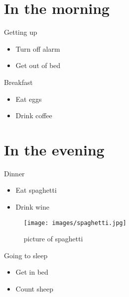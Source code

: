 \section{In the morning}\label{in-the-morning}

\begin{frame}{Getting up}

\begin{itemize}
\tightlist
\item
  Turn off alarm
\item
  Get out of bed
\end{itemize}

\end{frame}

\begin{frame}{Breakfast}

\begin{itemize}
\tightlist
\item
  Eat eggs
\item
  Drink coffee
\end{itemize}

\end{frame}

\section{In the evening}\label{in-the-evening}

\begin{frame}{Dinner}

\begin{itemize}
\tightlist
\item
  Eat spaghetti
\item
  Drink wine
\end{itemize}

\end{frame}

\begin{frame}

\begin{figure}
\centering
\texttt{[image: images/spaghetti.jpg]}
\caption{picture of spaghetti}
\end{figure}

\end{frame}

\begin{frame}{Going to sleep}

\begin{itemize}
\tightlist
\item
  Get in bed
\item
  Count sheep
\end{itemize}

\end{frame}
